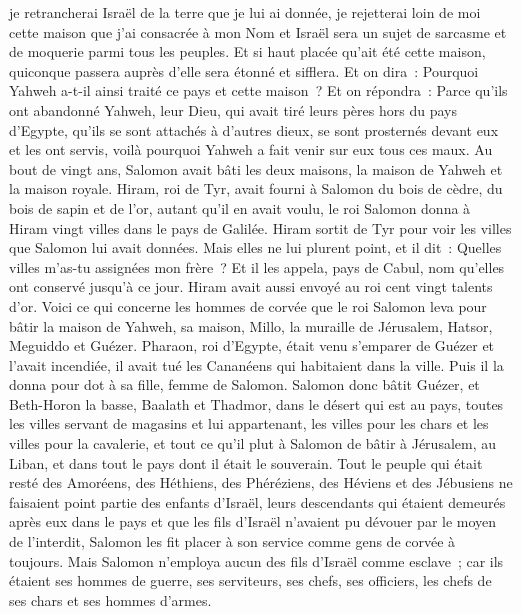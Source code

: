 \begin{multicols}{2}
je retrancherai Israël de la terre que je lui ai donnée, je rejetterai loin de moi cette maison que j'ai consacrée à mon Nom et Israël sera un sujet de sarcasme et de moquerie parmi tous les peuples.
Et si haut placée qu'ait été cette maison, quiconque passera auprès d'elle sera étonné et sifflera. Et on dira~: Pourquoi Yahweh a-t-il ainsi traité ce pays et cette maison~?
Et on répondra~: Parce qu'ils ont abandonné Yahweh, leur Dieu, qui avait tiré leurs pères hors du pays d'Egypte, qu'ils se sont attachés à d'autres dieux, se sont prosternés devant eux et les ont servis, voilà pourquoi Yahweh a fait venir sur eux tous ces maux.
Au bout de vingt ans, Salomon avait bâti les deux maisons, la maison de Yahweh et la maison royale.
Hiram, roi de Tyr, avait fourni à Salomon du bois de cèdre, du bois de sapin et de l'or, autant qu'il en avait voulu, le roi Salomon donna à Hiram vingt villes dans le pays de Galilée.
Hiram sortit de Tyr pour voir les villes que Salomon lui avait données. Mais elles ne lui plurent point,
et il dit~: Quelles villes m'as-tu assignées mon frère~? Et il les appela, pays de Cabul, nom qu'elles ont conservé jusqu'à ce jour.
Hiram avait aussi envoyé au roi cent vingt talents d'or.
Voici ce qui concerne les hommes de corvée que le roi Salomon leva pour bâtir la maison de Yahweh, sa maison, Millo, la muraille de Jérusalem, Hatsor, Meguiddo et Guézer.
Pharaon, roi d'Egypte, était venu s'emparer de Guézer et l'avait incendiée, il avait tué les Cananéens qui habitaient dans la ville. Puis il la donna pour dot à sa fille, femme de Salomon.
Salomon donc bâtit Guézer, et Beth-Horon la basse,
Baalath et Thadmor, dans le désert qui est au pays,
toutes les villes servant de magasins et lui appartenant, les villes pour les chars et les villes pour la cavalerie, et tout ce qu'il plut à Salomon de bâtir à Jérusalem, au Liban, et dans tout le pays dont il était le souverain.
Tout le peuple qui était resté des Amoréens, des Héthiens, des Phéréziens, des Héviens et des Jébusiens ne faisaient point partie des enfants d'Israël,
leurs descendants qui étaient demeurés après eux dans le pays et que les fils d'Israël n'avaient pu dévouer par le moyen de l'interdit, Salomon les fit placer à son service comme gens de corvée à toujours.
Mais Salomon n'employa aucun des fils d'Israël comme esclave~; car ils étaient ses hommes de guerre, ses serviteurs, ses chefs, ses officiers, les chefs de ses chars et ses hommes d'armes.

\end{multicols}
